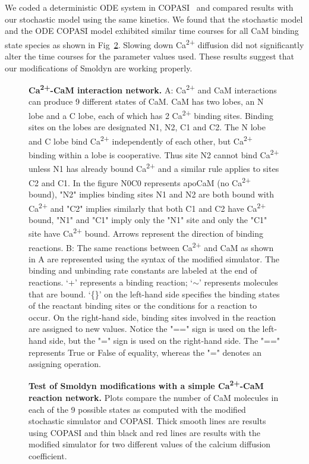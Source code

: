 \documentclass[10pt,letterpaper]{article}
\begin{document}
We coded a deterministic ODE system in COPASI~\cite{Hoops:2006gy} and compared results with our stochastic model using the same kinetics. We found that the stochastic model and the ODE COPASI model exhibited similar time courses for all CaM binding state species as shown in Fig~\ref{fig2}. Slowing down Ca\textsuperscript{2+} diffusion did not significantly alter the time courses for the parameter values used. These results suggest that our modifications of Smoldyn are working properly. 

\begin{figure}[!h]
	\caption{{\bf Ca\textsuperscript{2+}-CaM interaction network.}
	A: Ca\textsuperscript{2+} and CaM interactions can produce 9 different states of CaM. CaM has two lobes, an N lobe and a C lobe, each of which has 2 Ca\textsuperscript{2+} binding sites. Binding sites on the lobes are designated N1, N2, C1 and C2. The N lobe and C lobe bind Ca\textsuperscript{2+} independently of each other, but Ca\textsuperscript{2+} binding within a lobe is cooperative. Thus site N2 cannot bind Ca\textsuperscript{2+} unless N1 has already bound Ca\textsuperscript{2+} and a similar rule applies to sites C2 and C1. In the figure N0C0 represents apoCaM (no Ca\textsuperscript{2+} bound), "N2" implies binding sites N1 and N2 are both bound with Ca\textsuperscript{2+} and "C2" implies similarly that both C1 and C2 have Ca\textsuperscript{2+} bound, "N1" and "C1" imply only the "N1" site and only the "C1" site have Ca\textsuperscript{2+} bound. Arrows represent the direction of binding reactions.
	B: The same reactions between Ca\textsuperscript{2+} and CaM as shown in A are represented using the syntax of the modified simulator. The binding and unbinding rate constants are labeled at the end of reactions. ‘+’ represents a binding reaction; ‘$\sim$’ represents molecules that are bound. ‘\{\}’ on the left-hand side specifies the binding states of the reactant binding sites or the conditions for a reaction to occur. On the right-hand side, binding sites involved in the reaction are assigned to new values. Notice the "==" sign is used on the left-hand side, but the "=" sign is used on the right-hand side. The "==" represents True or False of equality, whereas the "=" denotes an assigning operation. 
	}
\label{fig1}
\end{figure}
	 
\begin{figure}[!h]
	\caption{{\bf Test of Smoldyn modifications with a simple Ca\textsuperscript{2+}-CaM reaction network.}
	Plots compare the number of CaM molecules in each of the 9 possible states as computed with the modified stochastic simulator and COPASI. Thick smooth lines are results using COPASI and thin black and red lines are results with the modified simulator for two different values of the calcium diffusion coefficient.
	}
\label{fig2}
\end{figure}
\end{document}
